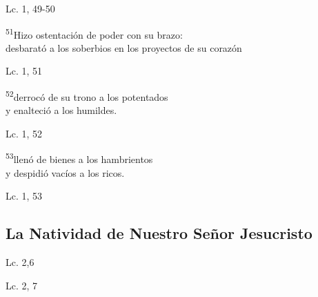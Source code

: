 \documentclass[a4paper,11pt,sans]{article}
\begin{document}
      \begin{center}
        Lc. 1, 49-50          
      \end{center}
      
      \begin{center}
        \textsuperscript{51}Hizo ostentación de poder con su brazo: \\
        desbarató a los soberbios en los proyectos de su corazón
      \end{center}

      \begin{center}
        Lc. 1, 51        
      \end{center}
      
      \begin{center}
        \textsuperscript{52}derrocó de su trono a los potentados \\
        y enalteció a los humildes.
      \end{center}

      \begin{center}
        Lc. 1, 52       
      \end{center}      
      
      \begin{center}
        \textsuperscript{53}llenó de bienes a los hambrientos \\
        y despidió vacíos a los ricos.
      \end{center}

      \begin{center}
        Lc. 1, 53        
      \end{center}
            
    \subsection*{\hfil La Natividad de Nuestro Señor Jesucristo \hfil}
      
      \begin{multicols}{2}

      \columnbreak
          
      \end{multicols}
      \begin{center}
        Lc. 2,6        
      \end{center}
      
      \begin{multicols}{2}

      \columnbreak
          
      \end{multicols}
      \begin{center}
        Lc. 2, 7          
      \end{center}
      
\end{document}

